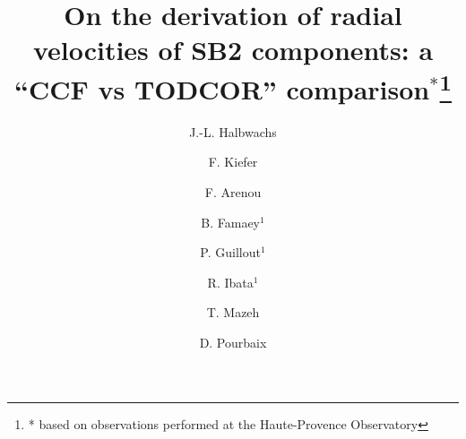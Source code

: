 \documentclass{sf2a-conf2017}
\begin{document}


\title{On the derivation of radial velocities of SB2 components: a ``CCF vs TODCOR'' comparison$^*$\footnote{* based on observations performed at the
Haute-Provence Observatory}}


\author{J.-L. Halbwachs}\address{Universit\'e de Strasbourg, CNRS, Observatoire astronomique de Strasbourg, UMR 7550, F-67000 Strasbourg, France }

\author{F. Kiefer}\address{Institut d'Astrophysique de Paris, CNRS, UMR 7095, 98bis boulevard Arago, F-75014 Paris}

\author{F. Arenou}\address{GEPI, Observatoire de Paris, PSL Research University, CNRS, Universit\'e Paris Diderot, Sorbonne Paris Cit\'e, Place Jules Janssen, F-92195 Meudon, France}

\author{B. Famaey$^1$}

\author{P. Guillout$^1$}

\author{R. Ibata$^1$}

\author{T. Mazeh}\address{School of Physics and Astronomy, Tel Aviv University, Tel Aviv 69978, Israel}

\author{D. Pourbaix}\address{FNRS, Institut d'Astronomie et d'Astrophysique, Universit\'{e} Libre de Bruxelles, boulevard du Triomphe, 1050 Bruxelles, Belgium}





\setcounter{page}{237}




\maketitle
\end{document}
